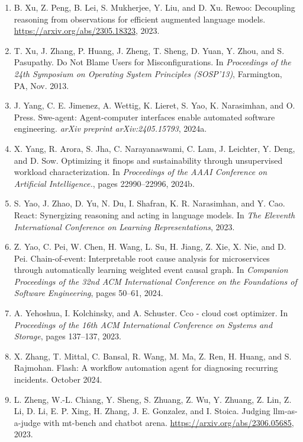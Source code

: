 \begin{enumerate}[leftmargin=2em,itemsep=2pt]
\item B. Xu, Z. Peng, B. Lei, S. Mukherjee, Y. Liu, and D. Xu. Rewoo: Decoupling reasoning from observations for efficient augmented language models. \url{https://arxiv.org/abs/2305.18323}, 2023.

\item T. Xu, J. Zhang, P. Huang, J. Zheng, T. Sheng, D. Yuan, Y. Zhou, and S. Pasupathy. Do Not Blame Users for Misconfigurations. In \textit{Proceedings of the 24th Symposium on Operating System Principles (SOSP'13)}, Farmington, PA, Nov. 2013.

\item J. Yang, C. E. Jimenez, A. Wettig, K. Lieret, S. Yao, K. Narasimhan, and O. Press. Swe-agent: Agent-computer interfaces enable automated software engineering. \textit{arXiv preprint arXiv:2405.15793}, 2024a.

\item X. Yang, R. Arora, S. Jha, C. Narayanaswami, C. Lam, J. Leichter, Y. Deng, and D. Sow. Optimizing it finops and sustainability through unsupervised workload characterization. In \textit{Proceedings of the AAAI Conference on Artificial Intelligence.}, pages 22990--22996, 2024b.

\item S. Yao, J. Zhao, D. Yu, N. Du, I. Shafran, K. R. Narasimhan, and Y. Cao. React: Synergizing reasoning and acting in language models. In \textit{The Eleventh International Conference on Learning Representations}, 2023.

\item Z. Yao, C. Pei, W. Chen, H. Wang, L. Su, H. Jiang, Z. Xie, X. Nie, and D. Pei. Chain-of-event: Interpretable root cause analysis for microservices through automatically learning weighted event causal graph. In \textit{Companion Proceedings of the 32nd ACM International Conference on the Foundations of Software Engineering}, pages 50--61, 2024.

\item A. Yehoshua, I. Kolchinsky, and A. Schuster. Cco - cloud cost optimizer. In \textit{Proceedings of the 16th ACM International Conference on Systems and Storage}, pages 137--137, 2023.

\item X. Zhang, T. Mittal, C. Bansal, R. Wang, M. Ma, Z. Ren, H. Huang, and S. Rajmohan. Flash: A workflow automation agent for diagnosing recurring incidents. October 2024.

\item L. Zheng, W.-L. Chiang, Y. Sheng, S. Zhuang, Z. Wu, Y. Zhuang, Z. Lin, Z. Li, D. Li, E. P. Xing, H. Zhang, J. E. Gonzalez, and I. Stoica. Judging llm-as-a-judge with mt-bench and chatbot arena. \url{https://arxiv.org/abs/2306.05685}, 2023.


\end{enumerate}
